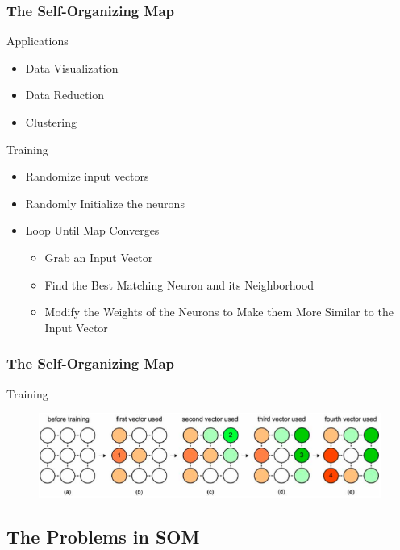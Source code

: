 \documentclass[nototal,handout]{beamer}
\begin{document}
\begin{frame}
	\frametitle{The Self-Organizing Map}
 
\begin{block}{Applications}
 \begin{itemize}
 \item  Data Visualization
 \item  Data Reduction
 \item  Clustering
 \end{itemize}
 \end{block} 
\begin{block}{Training}
 \begin{itemize}
 \item  Randomize input vectors
 \item  Randomly Initialize the neurons
 \item  Loop Until Map Converges
 \begin{itemize}
 \item  Grab an Input Vector
 \item  Find the Best Matching Neuron and its Neighborhood
 \item  Modify the Weights of the Neurons to Make them More Similar to the Input Vector
 \end{itemize}
 \end{itemize}
 \end{block} \end{frame} 

\begin{frame}
	\frametitle{The Self-Organizing Map}
 
\begin{block}{Training}
  \begin{center}
  \begin{figure}
  \includegraphics[width=0.90\linewidth]{training.png}
  \end{figure}
  \end{center}
 \end{block} \end{frame} 

\subsection{The Problems in SOM} 
\end{document}
